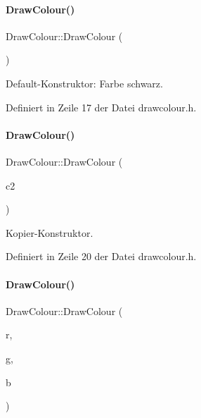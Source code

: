 \paragraph{\texorpdfstring{Draw\+Colour()}{DrawColour()}\hspace{0.1cm}{\footnotesize\ttfamily [1/4]}}
{\footnotesize\ttfamily Draw\+Colour\+::\+Draw\+Colour (\begin{DoxyParamCaption}{ }\end{DoxyParamCaption})\hspace{0.3cm}{\ttfamily [inline]}}



Default-\/\+Konstruktor\+: Farbe schwarz. 



Definiert in Zeile 17 der Datei drawcolour.\+h.

\mbox{\label{classDrawColour_a1c59565e58972adcf8c7d4039dcfba12}} 
\paragraph{\texorpdfstring{Draw\+Colour()}{DrawColour()}\hspace{0.1cm}{\footnotesize\ttfamily [2/4]}}
{\footnotesize\ttfamily Draw\+Colour\+::\+Draw\+Colour (\begin{DoxyParamCaption}\item[{const Q\+Color \&}]{c2 }\end{DoxyParamCaption})\hspace{0.3cm}{\ttfamily [inline]}}



Kopier-\/\+Konstruktor. 



Definiert in Zeile 20 der Datei drawcolour.\+h.

\mbox{\label{classDrawColour_ae1e915e236c257088107e4aeffabfbbb}} 
\paragraph{\texorpdfstring{Draw\+Colour()}{DrawColour()}\hspace{0.1cm}{\footnotesize\ttfamily [3/4]}}
{\footnotesize\ttfamily Draw\+Colour\+::\+Draw\+Colour (\begin{DoxyParamCaption}\item[{int}]{r,  }\item[{int}]{g,  }\item[{int}]{b }\end{DoxyParamCaption})\hspace{0.3cm}{\ttfamily [inline]}}



